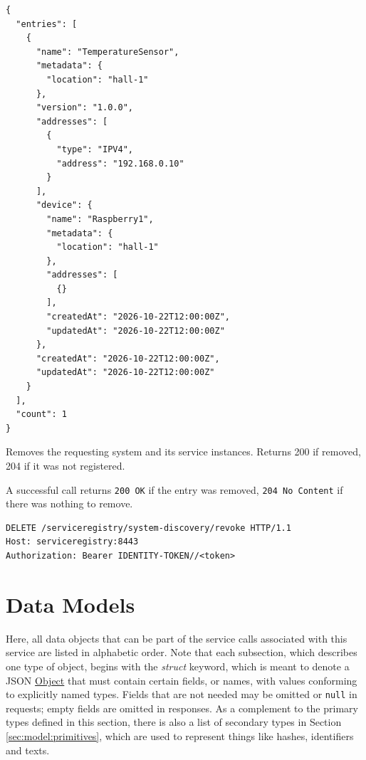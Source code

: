\documentclass[a4paper]{arrowhead}
\newcommand{\oref}[1]{{\textcolor{ArrowheadBlue}{\hyperref[sec:operations:#1]{#1}}}}
\newcommand{\pref}[1]{{\textcolor{ArrowheadGrey}{\hyperref[sec:model:primitives:#1]{#1}}}}
\begin{document}
\begin{lstlisting}[label={lst:lookup-resp},caption={An \oref{lookup} response.}]
{
  "entries": [
    {
      "name": "TemperatureSensor",
      "metadata": {
        "location": "hall-1"
      },
      "version": "1.0.0",
      "addresses": [
        {
          "type": "IPV4",
          "address": "192.168.0.10"
        }
      ],
      "device": {
        "name": "Raspberry1",
        "metadata": {
          "location": "hall-1"
        },
        "addresses": [
          {}
        ],
        "createdAt": "2026-10-22T12:00:00Z",
        "updatedAt": "2026-10-22T12:00:00Z"
      },
      "createdAt": "2026-10-22T12:00:00Z",
      "updatedAt": "2026-10-22T12:00:00Z"
    }
  ],
  "count": 1
}
\end{lstlisting}


Removes the requesting system and its service instances. Returns 200 if removed, 204 if it was not registered.

A successful call returns \texttt{200 OK} if the entry was removed, \texttt{204 No Content} if there was nothing to remove.

\begin{lstlisting}[label={lst:revoke},caption={An \oref{revoke} invocation.}]
DELETE /serviceregistry/system-discovery/revoke HTTP/1.1
Host: serviceregistry:8443
Authorization: Bearer IDENTITY-TOKEN//<token>
\end{lstlisting}

\newpage

\section{Data Models}
\label{sec:model}

Here, all data objects that can be part of the service calls associated with this service are listed in alphabetic order.
Note that each subsection, which describes one type of object, begins with the \textit{struct} keyword, which is meant to denote a JSON \pref{Object} that must contain certain fields, or names, with values conforming to explicitly named types.
Fields that are not needed may be omitted or \texttt{null} in requests; empty fields are omitted in responses.
As a complement to the primary types defined in this section, there is also a list of secondary types in Section \ref{sec:model:primitives}, which are used to represent things like hashes, identifiers and texts.
\end{document}
